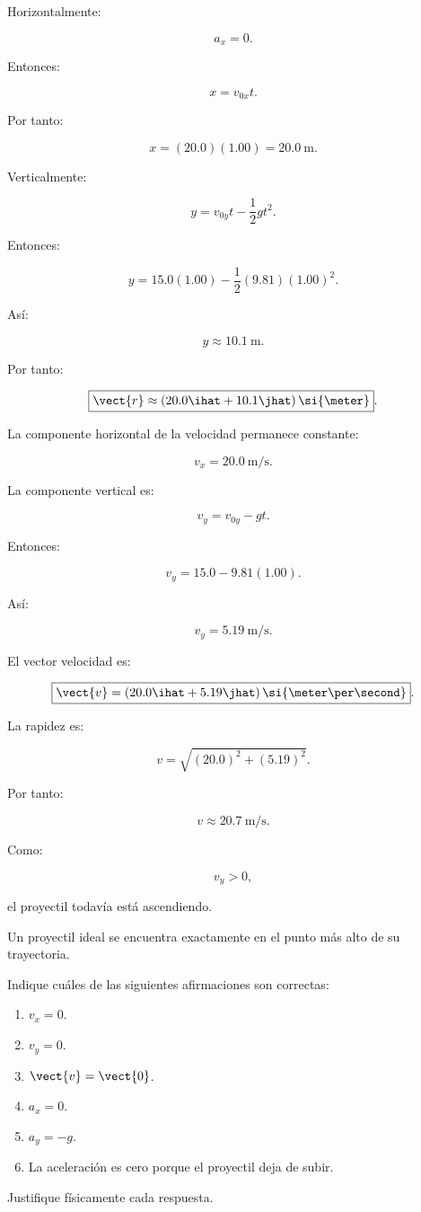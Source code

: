 \begin{explicacion}
Horizontalmente:

\[
a_x=0.
\]

Entonces:

\[
x=v_{0x}t.
\]

Por tanto:

\[
x
=
(20.0)(1.00)
=
\SI{20.0}{\meter}.
\]

Verticalmente:

\[
y
=
v_{0y}t
-
\frac{1}{2}gt^2.
\]

Entonces:

\[
y
=
15.0(1.00)
-
\frac{1}{2}(9.81)(1.00)^2.
\]

Así:

\[
y\approx\SI{10.1}{\meter}.
\]

Por tanto:

\[
\boxed{
\vect{r}
\approx
(20.0\ihat+10.1\jhat)\,\si{\meter}
}.
\]

La componente horizontal de la velocidad permanece constante:

\[
v_x
=
\SI{20.0}{\meter\per\second}.
\]

La componente vertical es:

\[
v_y
=
v_{0y}-gt.
\]

Entonces:

\[
v_y
=
15.0-9.81(1.00).
\]

Así:

\[
v_y
=
\SI{5.19}{\meter\per\second}.
\]

El vector velocidad es:

\[
\boxed{
\vect{v}
=
(20.0\ihat+5.19\jhat)
\,\si{\meter\per\second}
}.
\]

La rapidez es:

\[
v
=
\sqrt{
(20.0)^2+(5.19)^2
}.
\]

Por tanto:

\[
\boxed{
v\approx\SI{20.7}{\meter\per\second}
}.
\]

Como:

\[
v_y>0,
\]

el proyectil todavía está ascendiendo.
\end{explicacion}


\begin{ejercicio}
Un proyectil ideal se encuentra exactamente en el punto más alto de su
trayectoria.

Indique cuáles de las siguientes afirmaciones son correctas:

\begin{enumerate}[label=\alph*)]
    \item \(v_x=0\).
    \item \(v_y=0\).
    \item \(\vect{v}=\vect{0}\).
    \item \(a_x=0\).
    \item \(a_y=-g\).
    \item La aceleración es cero porque el proyectil deja de subir.
\end{enumerate}

Justifique físicamente cada respuesta.
\end{ejercicio}

